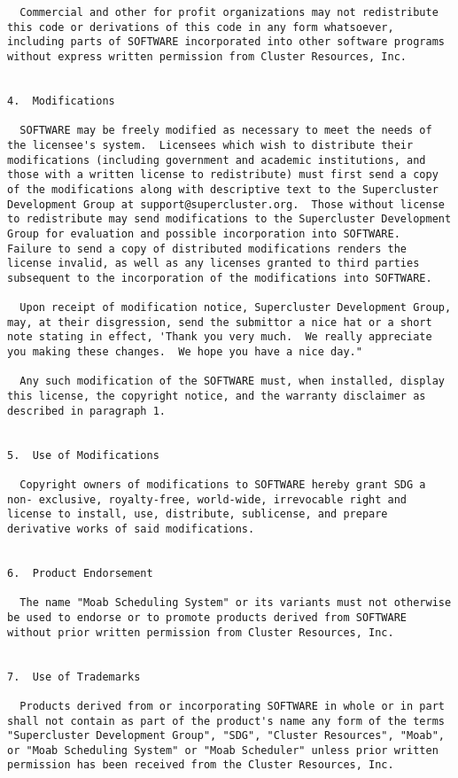 \begin{verbatim}
  Commercial and other for profit organizations may not redistribute
this code or derivations of this code in any form whatsoever,
including parts of SOFTWARE incorporated into other software programs
without express written permission from Cluster Resources, Inc.


4.  Modifications

  SOFTWARE may be freely modified as necessary to meet the needs of
the licensee's system.  Licensees which wish to distribute their
modifications (including government and academic institutions, and
those with a written license to redistribute) must first send a copy
of the modifications along with descriptive text to the Supercluster
Development Group at support@supercluster.org.  Those without license
to redistribute may send modifications to the Supercluster Development
Group for evaluation and possible incorporation into SOFTWARE.
Failure to send a copy of distributed modifications renders the
license invalid, as well as any licenses granted to third parties
subsequent to the incorporation of the modifications into SOFTWARE.

  Upon receipt of modification notice, Supercluster Development Group,
may, at their disgression, send the submittor a nice hat or a short
note stating in effect, 'Thank you very much.  We really appreciate
you making these changes.  We hope you have a nice day."

  Any such modification of the SOFTWARE must, when installed, display
this license, the copyright notice, and the warranty disclaimer as
described in paragraph 1.


5.  Use of Modifications

  Copyright owners of modifications to SOFTWARE hereby grant SDG a
non- exclusive, royalty-free, world-wide, irrevocable right and
license to install, use, distribute, sublicense, and prepare
derivative works of said modifications.


6.  Product Endorsement

  The name "Moab Scheduling System" or its variants must not otherwise
be used to endorse or to promote products derived from SOFTWARE
without prior written permission from Cluster Resources, Inc.


7.  Use of Trademarks

  Products derived from or incorporating SOFTWARE in whole or in part
shall not contain as part of the product's name any form of the terms
"Supercluster Development Group", "SDG", "Cluster Resources", "Moab",
or "Moab Scheduling System" or "Moab Scheduler" unless prior written
permission has been received from the Cluster Resources, Inc.



\end{verbatim}
